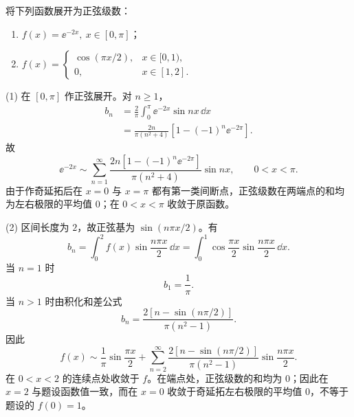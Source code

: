 \begin{xexercise}[5]
将下列函数展开为正弦级数：
  \begin{enumerate}[label=(\arabic*)]
    \item $f(x)=\ee^{-2x},\ x\in[0,\pi]$；
    \item $f(x)=\begin{cases}\cos(\pi x/2),&x\in[0,1),\\0,&x\in[1,2].\end{cases}$
  \end{enumerate}
\end{xexercise}
\begin{xsolution}
(1) 在 $[0,\pi]$ 作正弦展开。对 $n\ge1$，
\begin{align*}
  b_n
  &=\frac2\pi\int_0^\pi\ee^{-2x}\sin nx\,\dd x\\
  &=\frac{2n}{\pi(n^2+4)}
    \left[1-(-1)^n\ee^{-2\pi}\right].
\end{align*}
故
\[
  \boxed{\displaystyle
  \ee^{-2x}\sim
  \sum_{n=1}^{\infty}
  \frac{2n[1-(-1)^n\ee^{-2\pi}]}{\pi(n^2+4)}\sin nx,
  \qquad0<x<\pi }.
\]
由于作奇延拓后在 $x=0$ 与 $x=\pi$ 都有第一类间断点，正弦级数在两端点的和均为左右极限的平均值 $0$；在 $0<x<\pi$ 收敛于原函数。

(2) 区间长度为 $2$，故正弦基为 $\sin(n\pi x/2)$。有
\[
  b_n=\int_0^2f(x)\sin\frac{n\pi x}{2}\,\dd x
  =\int_0^1\cos\frac{\pi x}{2}\sin\frac{n\pi x}{2}\,\dd x.
\]
当 $n=1$ 时
\[
  b_1=\frac1\pi.
\]
当 $n>1$ 时由积化和差公式
\[
  b_n=\frac{2[n-\sin(n\pi/2)]}{\pi(n^2-1)}.
\]
因此
\[
  \boxed{\displaystyle
  f(x)\sim\frac1\pi\sin\frac{\pi x}{2}
  +\sum_{n=2}^{\infty}
  \frac{2[n-\sin(n\pi/2)]}{\pi(n^2-1)}
  \sin\frac{n\pi x}{2} }.
\]
在 $0<x<2$ 的连续点处收敛于 $f$。在端点处，正弦级数的和均为 $0$；因此在 $x=2$ 与题设函数值一致，而在 $x=0$ 收敛于奇延拓左右极限的平均值 $0$，不等于题设的 $f(0)=1$。
\end{xsolution}


